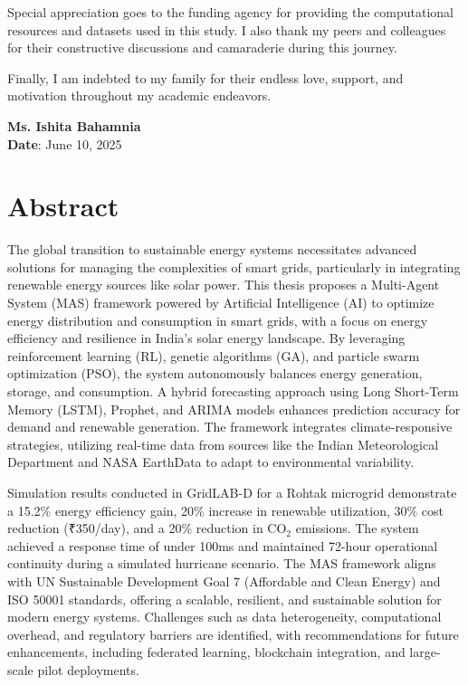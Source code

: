 \documentclass[12pt, a4paper, oneside]{book}
\begin{document}
Special appreciation goes to the funding agency for providing the computational resources and datasets used in this study. I also thank my peers and colleagues for their constructive discussions and camaraderie during this journey.

Finally, I am indebted to my family for their endless love, support, and motivation throughout my academic endeavors.

\vspace{1cm}
\textbf{Ms. Ishita Bahamnia}\\
\textbf{Date}: June 10, 2025

\chapter*{Abstract}
The global transition to sustainable energy systems necessitates advanced solutions for managing the complexities of smart grids, particularly in integrating renewable energy sources like solar power. This thesis proposes a Multi-Agent System (MAS) framework powered by Artificial Intelligence (AI) to optimize energy distribution and consumption in smart grids, with a focus on energy efficiency and resilience in India’s solar energy landscape. By leveraging reinforcement learning (RL), genetic algorithms (GA), and particle swarm optimization (PSO), the system autonomously balances energy generation, storage, and consumption. A hybrid forecasting approach using Long Short-Term Memory (LSTM), Prophet, and ARIMA models enhances prediction accuracy for demand and renewable generation. The framework integrates climate-responsive strategies, utilizing real-time data from sources like the Indian Meteorological Department and NASA EarthData to adapt to environmental variability.

Simulation results conducted in GridLAB-D for a Rohtak microgrid demonstrate a 15.2\% energy efficiency gain, 20\% increase in renewable utilization, 30\% cost reduction (₹350/day), and a 20\% reduction in CO$_2$ emissions. The system achieved a response time of under 100ms and maintained 72-hour operational continuity during a simulated hurricane scenario. The MAS framework aligns with UN Sustainable Development Goal 7 (Affordable and Clean Energy) and ISO 50001 standards, offering a scalable, resilient, and sustainable solution for modern energy systems. Challenges such as data heterogeneity, computational overhead, and regulatory barriers are identified, with recommendations for future enhancements, including federated learning, blockchain integration, and large-scale pilot deployments.
\end{document}
